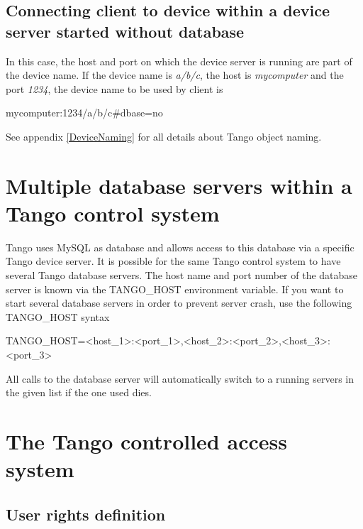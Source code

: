 \subsection{Connecting client to device within a device server started without
database}

In this case, the host and port on which the device server is running
are part of the device name. If the device name is \emph{a/b/c}, the
host is \emph{mycomputer} and the port \emph{1234}, the device name
to be used by client is\begin{center}mycomputer:1234/a/b/c\#dbase=no\end{center}

See appendix \ref{DeviceNaming} for all details about Tango object
naming.


\section{Multiple database servers within a Tango control system}

Tango uses MySQL as database and allows access to this database via
a specific Tango device server. It is possible for the same Tango
control system to have several Tango database servers. The host name
and port number of the database server is known via the TANGO\_HOST
environment variable. If you want to start several database servers
in order to prevent server crash, use the following TANGO\_HOST syntax\begin{center}

TANGO\_HOST=<host\_1>:<port\_1>,<host\_2>:<port\_2>,<host\_3>:<port\_3>\end{center}

All calls to the database server will automatically switch to a running
servers in the given list if the one used dies.


\section{The Tango controlled access system}


\subsection{User rights definition}

